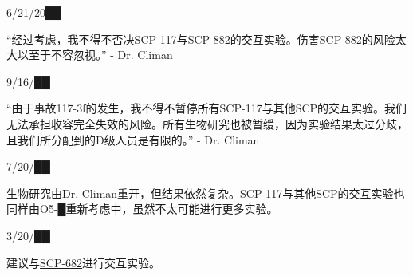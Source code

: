  6\slash 21\slash 20██

“经过考虑，我不得不否决SCP-117与SCP-882的交互实验。伤害SCP-882的风险太大以至于不容忽视。” - Dr. Climan

 9\slash 16\slash ██

“由于事故117-3f的发生，我不得不暂停所有SCP-117与其他SCP的交互实验。我们无法承担收容完全失效的风险。所有生物研究也被暂缓，因为实验结果太过分歧，且我们所分配到的D级人员是有限的。” - Dr. Climan

 7\slash 20\slash ██

生物研究由Dr. Climan重开，但结果依然复杂。SCP-117与其他SCP的交互实验也同样由O5-█重新考虑中，虽然不太可能进行更多实验。

 3\slash 20\slash ██

建议与\hyperref[chap:SCP-682]{SCP-682}进行交互实验。
